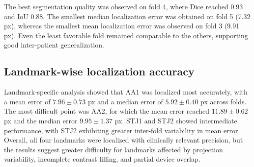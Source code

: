 \documentclass[preprint,12pt,authoryear]{elsarticle}
\begin{document}
The best segmentation quality was observed on fold 4, where Dice reached 0.93 and IoU 0.88. The smallest median localization error was obtained on fold 5 (7.32 px), whereas the smallest mean localization error was observed on fold 3 (9.91 px). Even the least favorable fold remained comparable to the others, supporting good inter-patient generalization.

\begin{table}[htbp]
\caption{Patient-level 5-fold cross-validation results for BAMNet.}
\label{tab:crossval}
\centering
{}
\end{table}

\subsection{Landmark-wise localization accuracy}

Landmark-specific analysis showed that AA1 was localized most accurately, with a mean error of $7.96 \pm 0.73$ px and a median error of $5.92 \pm 0.40$ px across folds. The most difficult point was AA2, for which the mean error reached $11.89 \pm 0.62$ px and the median error $9.95 \pm 1.37$ px. STJ1 and STJ2 showed intermediate performance, with STJ2 exhibiting greater inter-fold variability in mean error. Overall, all four landmarks were localized with clinically relevant precision, but the results suggest greater difficulty for landmarks affected by projection variability, incomplete contrast filling, and partial device overlap.
\end{document}
